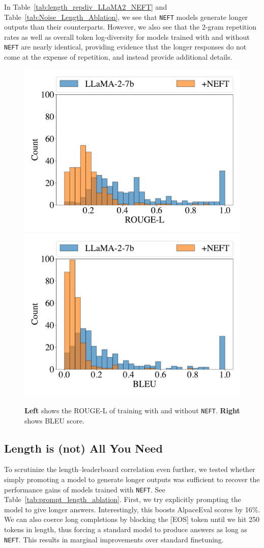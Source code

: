 \documentclass{article} %
\newcommand{\neft}{\texttt{NEFT}}
\begin{document}
In Table~\ref{tab:length_repdiv_LLaMA2_NEFT} and Table~\ref{tab:Noise_Length_Ablation}, we see that \neft{} models generate longer outputs than their counterparts. However, we also see that the 2-gram repetition rates as well as overall token log-diversity for models trained with and without \neft{} are nearly identical, providing evidence that the longer responses do not come at the expense of repetition, and instead provide additional details. 
\begin{figure}
    \centering
    \includegraphics[width=0.48\linewidth,trim={0cm 0.8cm 0cm 0.8cm},clip]{figures/alpaca-train_generation_rougeL_square.pdf}
    \includegraphics[width=0.48\linewidth,trim={0cm 0.8cm 0cm 0.8cm},clip]{figures/alpaca-train_generation_bleu_square.pdf}
    \caption{\textbf{Left} shows the ROUGE-L of training with and without \neft{}. \textbf{Right} shows BLEU score.}
    \label{fig:ROUGE_BLEU} 
\end{figure}


\subsection{Length is (not) All You Need} \label{sec:length_is_not_all_you_need}

To scrutinize the length--leaderboard correlation even further, we tested whether simply promoting a model to generate longer outputs was sufficient to recover the performance gains of models trained with \neft{}. See Table~\ref{tab:prompt_length_ablation}.
First, we try explicitly prompting the model to give longer answers. Interestingly, this boosts AlpaceEval scores by 16\%. 
We can also coerce long completions by blocking the [EOS] token until we hit 250 tokens in length, thus forcing a standard model to produce answers as long as \neft{}. This results in marginal improvements over standard finetuning.
\end{document}
